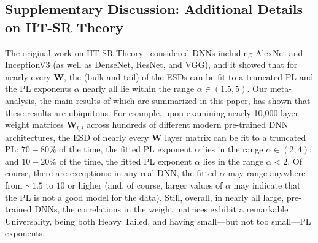 \subsection{Supplementary Discussion: Additional Details on HT-SR Theory}

The original work on HT-SR Theory~\cite{MM18_TR,MM19_HTSR_ICML,MM20_SDM} considered DNNs including AlexNet and InceptionV3 (as well as DenseNet, ResNet, and VGG), and it showed that for nearly every $\mathbf{W}$, the (bulk and tail) of the ESDs can be fit to a truncated PL and the PL exponents $\alpha$ nearly all lie within the range $\alpha\in(1.5,5)$.
Our meta-analysis, the main results of which are summarized in this paper, has shown that these results are ubiquitous.
For example, 
upon examining nearly 10,000 layer weight matrices $\mathbf{W}_{l,i}$ across hundreds of different modern pre-trained DNN architectures, the ESD of nearly every $\mathbf{W}$ layer matrix can be fit to a truncated PL:
$70-80\%$ of the time, the fitted PL exponent $\alpha$ lies in the range $\alpha\in(2,4)$; and  
$10-20\%$ of the time, the fitted PL exponent $\alpha$ lies in the range $\alpha< 2$.  
Of course, there are exceptions: in any real DNN, the fitted $\alpha$ may range anywhere from $\sim 1.5$ to $10$ or higher (and, of course, larger values of $\alpha$ may indicate that the PL is not a good model for the data).  
Still, overall, in nearly all large, pre-trained DNNs, the correlations in the  weight matrices exhibit a remarkable Universality, being both Heavy Tailed, and having small---but not too small---PL exponents. 

